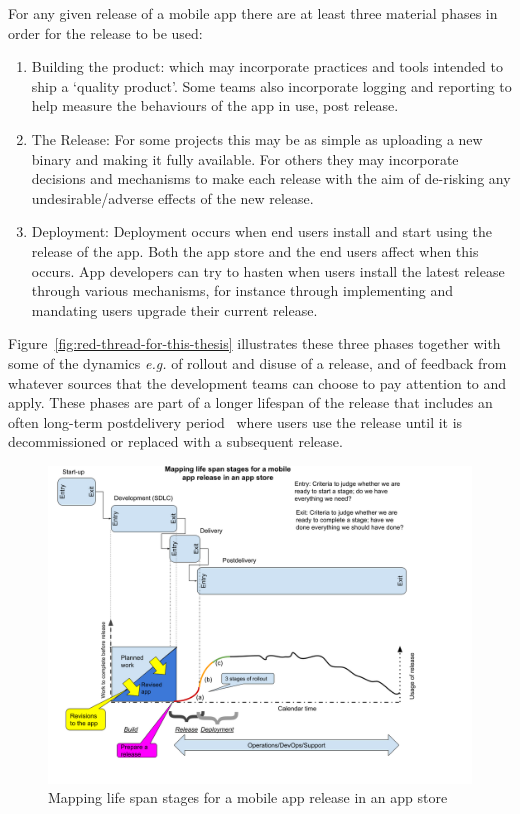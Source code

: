 For any given release of a mobile app there are at least three material phases in order for the release to be used:
\begin{enumerate}
    \item Building the product: which may incorporate practices and tools intended to ship a `quality product'. Some teams also incorporate logging and reporting to help measure the behaviours of the app in use, post release.
    \item The Release: For some projects this may be as simple as uploading a new binary and making it fully available. For others they may incorporate decisions and mechanisms to make each release with the aim of de-risking any undesirable/adverse effects of the new release.
    \item Deployment: Deployment occurs when end users install and start using the release of the app. Both the app store and the end users affect when this occurs. App developers can try to hasten when users install the latest release through various mechanisms, for instance through implementing and mandating users upgrade their current release.
\end{enumerate}

Figure~\ref{fig:red-thread-for-this-thesis} illustrates these three phases together with some of the dynamics \emph{e.g.} of rollout and disuse of a release, and of feedback from whatever sources that the development teams can choose to pay attention to and apply. These phases are part of a longer lifespan of the release that includes an often long-term postdelivery period~\citep[pp 156-157]{evans2004_achieving_software_quality_through_teamwork} where users use the release until it is decommissioned or replaced with a subsequent release.

\begin{figure}
    \centering
    \includegraphics[width=16cm]{images/my/mobile-app-life-span-stages-21-sep-2021.png}
    \caption{Mapping life span stages for a mobile app release in an app store}
    \label{fig:mobile-app-life-span-stages}
\end{figure}

